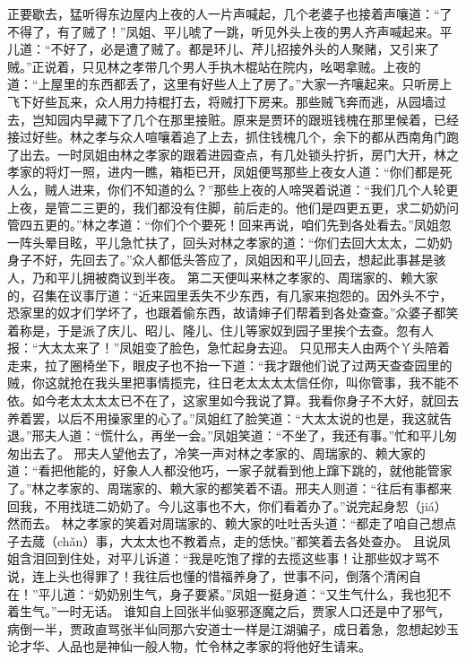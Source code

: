 \documentclass[12pt,oneside]{book}
\begin{document}
正要歇去，猛听得东边屋内上夜的人一片声喊起，几个老婆子也接着声嚷道：“了不得了，有了贼了！”凤姐、平儿唬了一跳，听见外头上夜的男人齐声喊起来。平儿道：“不好了，必是遭了贼了。都是环儿、芹儿招接外头的人聚赌，又引来了贼。”正说着，只见林之孝带几个男人手执木棍站在院内，吆喝拿贼。上夜的道：“上屋里的东西都丢了，这里有好些人上了房了。”大家一齐嚷起来。只听房上飞下好些瓦来，众人用力持棍打去，将贼打下房来。那些贼飞奔而逃，从园墙过去，岂知园内早藏下了几个在那里接赃。原来是贾环的跟班钱槐在那里候着，已经接过好些。林之孝与众人喧嚷着追了上去，抓住钱槐几个，余下的都从西南角门跑了出去。一时凤姐由林之孝家的跟着进园查点，有几处锁头拧折，房门大开，林之孝家的将灯一照，进内一瞧，箱柜已开，凤姐便骂那些上夜女人道：“你们都是死人么，贼人进来，你们不知道的么？”那些上夜的人啼哭着说道：“我们几个人轮更上夜，是管二三更的，我们都没有住脚，前后走的。他们是四更五更，求二奶奶问管四五更的。”林之孝道：“你们个个要死！回来再说，咱们先到各处看去。”凤姐忽一阵头晕目眩，平儿急忙扶了，回头对林之孝家的道：“你们去回大太太，二奶奶身子不好，先回去了。”众人都低头答应了，凤姐因和平儿回去，想起此事甚是骇人，乃和平儿拥被商议到半夜。
第二天便叫来林之孝家的、周瑞家的、赖大家的，召集在议事厅道：“近来园里丢失不少东西，有几家来抱怨的。因外头不宁，恐家里的奴才们学坏了，也跟着偷东西，故请婶子们帮着到各处查查。”众婆子都笑着称是，于是派了庆儿、昭儿、隆儿、住儿等家奴到园子里挨个去查。忽有人报：“大太太来了！”凤姐变了脸色，急忙起身去迎。
只见邢夫人由两个丫头陪着走来，拉了圈椅坐下，眼皮子也不抬一下道：“我才跟他们说了过两天查查园里的贼，你这就抢在我头里把事情揽完，往日老太太太太信任你，叫你管事，我不能不依。如今老太太太太已不在了，这家里如今我说了算。我看你身子不大好，就回去养着罢，以后不用操家里的心了。”凤姐红了脸笑道：“大太太说的也是，我这就告退。”邢夫人道：“慌什么，再坐一会。”凤姐笑道：“不坐了，我还有事。”忙和平儿匆匆出去了。
邢夫人望他去了，冷笑一声对林之孝家的、周瑞家的、赖大家的道：“看把他能的，好象人人都没他巧，一家子就看到他上蹿下跳的，就他能管家了。”林之孝家的、周瑞家的、赖大家的都笑着不语。邢夫人则道：“往后有事都来回我，不用找琏二奶奶了。今儿这事也不大，你们看着办了。”说完起身恝（jiá）然而去。
林之孝家的笑着对周瑞家的、赖大家的吐吐舌头道：“都走了咱自己想点子去蒇（chǎn）事，大太太也不教着点，走的恁快。”都笑着去各处查办。
且说凤姐含泪回到住处，对平儿诉道：“我是吃饱了撑的去揽这些事！让那些奴才骂不说，连上头也得罪了！我往后也懂的惜福养身了，世事不问，倒落个清闲自在！”平儿道：“奶奶别生气，身子要紧。”凤姐一挺身道：“又生气什么，我也犯不着生气。”一时无话。
谁知自上回张半仙驱邪逐魔之后，贾家人口还是中了邪气，病倒一半，贾政直骂张半仙同那六安道士一样是江湖骗子，成日着急，忽想起妙玉论才华、人品也是神仙一般人物，忙令林之孝家的将他好生请来。
\end{document}
